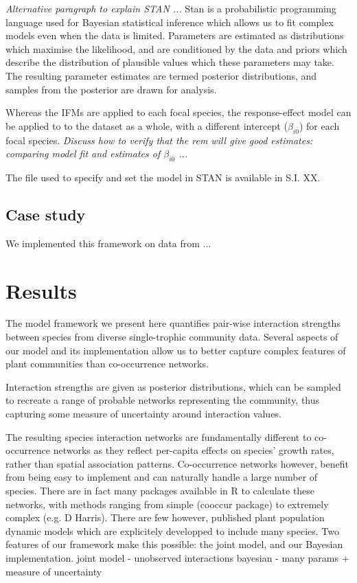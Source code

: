 \documentclass[a4,12pt]{article}
\begin{document}
        \textit{Alternative paragraph to explain STAN ...}
        Stan is a probabilistic programming language used for Bayesian statistical inference which allows us to fit complex models even when the data is limited. Parameters are estimated as distributions which maximise the likelihood, and are conditioned by the data and priors which describe the distribution of plausible values which these parameters may take. The resulting parameter estimates are termed posterior distributions, and samples from the posterior are drawn for analysis.
        
        Whereas the IFMs are applied to each focal species, the response-effect model can be applied to to the dataset as a whole, with a different intercept ($\beta_{i0}$) for each focal species. \textit{Discuss how to verify that the rem will give good estimates: comparing model fit and estimates of $\beta_{i0}$ ...}

        The file used to specify and set the model in STAN is available in S.I. XX. 
    
        \subsection{Case study}

        We implemented this framework on data from ...
        

    \section{Results}


    The model framework we present here quantifies pair-wise interaction strengths between species from diverse single-trophic community data. Several aspects of our model and its implementation allow us to better capture complex features of plant communities than co-occurrence networks. 

    Interaction strengths are given as posterior distributions, which can be sampled to recreate a range of probable networks representing the community, thus capturing some measure of uncertainty around interaction values. 

    The resulting species interaction networks are fundamentally different to co-occurrence networks as they reflect per-capita effects on species' growth rates, rather than spatial association patterns. 
    Co-occurrence networks however, benefit from being easy to implement and can naturally handle a large number of species. There are in fact many  packages available in R to calculate these networks, with methods ranging from simple (cooccur package) to extremely complex (e.g. D Harris). 
    There are few however, published plant population dynamic models which are explicitely developped to include many species. Two features of our framework make this possible: the joint model, and our Bayesian implementation.
    joint model - unobserved interactions 
    bayesian - many params + measure of uncertainty
\end{document}
